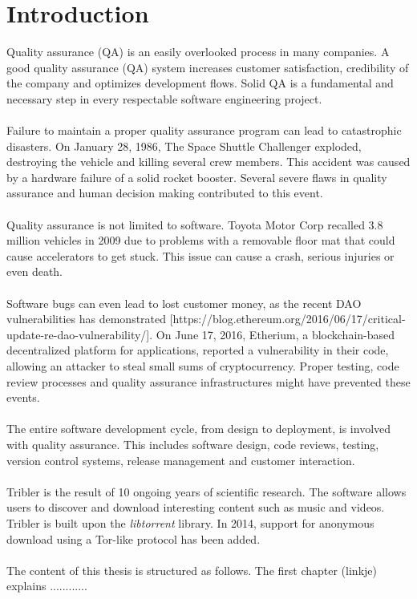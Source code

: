 \chapter{Introduction}

Quality assurance (QA) is an easily overlooked process in many companies.  A good quality assurance (QA) system increases customer satisfaction, credibility of the company and optimizes development flows. Solid QA is a fundamental and necessary step in every respectable software engineering project.\\\\
Failure to maintain a proper quality assurance program can lead to catastrophic disasters. On January 28, 1986, The Space Shuttle Challenger exploded, destroying the vehicle and killing several crew members. This accident was caused by a hardware failure of a solid rocket booster. Several severe flaws in quality assurance and human decision making contributed to this event.\\\\
Quality assurance is not limited to software. Toyota Motor Corp recalled 3.8 million vehicles in 2009 due to problems with a removable floor mat that could cause accelerators to get stuck. This issue can cause a crash, serious injuries or even death.\\\\
Software bugs can even lead to lost customer money, as the recent DAO vulnerabilities has demonstrated [https://blog.ethereum.org/2016/06/17/critical-update-re-dao-vulnerability/]. On June 17, 2016, Etherium, a blockchain-based decentralized platform for applications, reported a vulnerability in their code, allowing an attacker to steal small sums of cryptocurrency. Proper testing, code review processes and quality assurance infrastructures might have prevented these events.\\\\
The entire software development cycle, from design to deployment, is involved with quality assurance. This includes software design, code reviews, testing, version control systems, release management and customer interaction.\\\\
Tribler is the result of 10 ongoing years of scientific research. The software allows users to discover and download interesting content such as music and videos. Tribler is built upon the \emph{libtorrent} library. In 2014, support for anonymous download using a Tor-like protocol has been added.\\\\
The content of this thesis is structured as follows. The first chapter (linkje) explains ............

